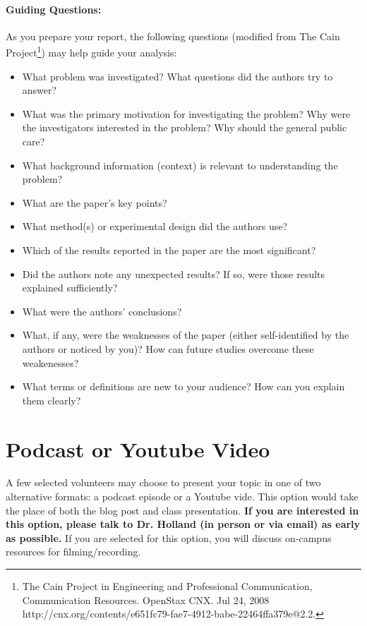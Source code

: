 \documentclass[11pt]{article}
\begin{document}
\paragraph{Guiding Questions:}
As you prepare your report, the following questions (modified from The Cain Project\footnote{The Cain Project in Engineering and Professional Communication, Communication Resources. OpenStax CNX. Jul 24, 2008 http://cnx.org/contents/e651fc79-fae7-4912-babe-22464ffa379e@2.2.})
may help guide your analysis:
\begin{itemize}
\item What problem was investigated? What questions did the authors try to answer?
\item What was the primary motivation for investigating the problem?  Why were the investigators interested in the problem?  Why should the general public care?
\item What background information (context) is relevant to understanding the problem?
\item What are the paper's key points?
\item What method(s) or experimental design did the authors use?
\item Which of the results reported in the paper are the most significant?
\item Did the authors note any unexpected results? If so, were those results explained sufficiently?
\item What were the authors' conclusions?
\item What, if any, were the weaknesses of the paper (either self-identified by the authors or noticed by you)?  How can future studies overcome these weakenesses?
\item What terms or definitions are new to your audience? How can you explain them clearly?
\end{itemize}


\section{Podcast or Youtube Video}
A few selected volunteers may choose to present your topic in one of two alternative formats: a podcast episode or a Youtube vide.
This option would take the place of both the blog post and class presentation.  
{\bf If you are interested in this option, please talk to Dr. Holland (in person or via email) as early as possible.}  
If you are selected for this option, you will discuss on-campus resources for filming/recording.
\end{document}
